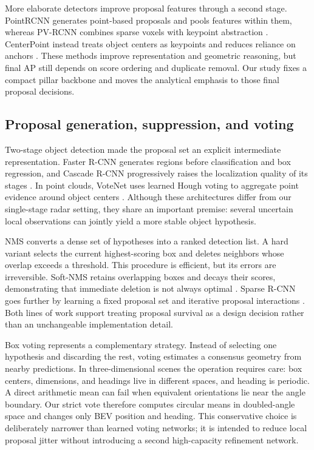 \documentclass[preprint,12pt,times]{elsarticle}
\begin{document}
More elaborate detectors improve proposal features through a second stage.
PointRCNN generates point-based proposals and pools features within them,
whereas PV-RCNN combines sparse voxels with keypoint abstraction
\cite{shi2019pointrcnn,shi2020pvrcnn}. CenterPoint instead treats object
centers as keypoints and reduces reliance on anchors
\cite{yin2021centerpoint}. These methods improve representation and geometric
reasoning, but final AP still depends on score ordering and duplicate removal.
Our study fixes a compact pillar backbone and moves the analytical emphasis to
those final proposal decisions.

\subsection{Proposal generation, suppression, and voting}

Two-stage object detection made the proposal set an explicit intermediate
representation. Faster R-CNN generates regions before classification and box
regression, and Cascade R-CNN progressively raises the localization quality of
its stages \cite{ren2017fasterrcnn,cai2018cascadercnn}. In point clouds,
VoteNet uses learned Hough voting to aggregate point evidence around object
centers \cite{qi2019votenet}. Although these architectures differ from our
single-stage radar setting, they share an important premise: several uncertain
local observations can jointly yield a more stable object hypothesis.

NMS converts a dense set of hypotheses into a ranked detection list. A hard
variant selects the current highest-scoring box and deletes neighbors whose
overlap exceeds a threshold. This procedure is efficient, but its errors are
irreversible. Soft-NMS retains overlapping boxes and decays their scores,
demonstrating that immediate deletion is not always optimal
\cite{bodla2017softnms}. Sparse R-CNN goes further by learning a fixed proposal
set and iterative proposal interactions \cite{sun2021sparsercnn}. Both lines
of work support treating proposal survival as a design decision rather than an
unchangeable implementation detail.

Box voting represents a complementary strategy. Instead of selecting one
hypothesis and discarding the rest, voting estimates a consensus geometry from
nearby predictions. In three-dimensional scenes the operation requires care:
box centers, dimensions, and headings live in different spaces, and heading is
periodic. A direct arithmetic mean can fail when equivalent orientations lie
near the angle boundary. Our strict vote therefore computes circular means in
doubled-angle space and changes only BEV position and heading. This conservative
choice is deliberately narrower than learned voting networks; it is intended
to reduce local proposal jitter without introducing a second high-capacity
refinement network.
\end{document}
